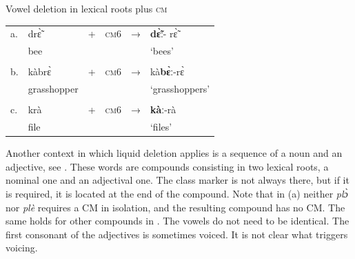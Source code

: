 \documentclass[output=paper]{langscibook}
\begin{document}
    \begin{exe} 
        \ex Vowel deletion in lexical roots plus \textsc{cm} \label{ex:traore:liquidDeletionLexicalRootsCM:27}\\
        \begin{tabularx}{.8\textwidth}{l l l l l l}
            a. & drɛ̃̀        &   +   &   \textsc{cm}6    &   →   & \textbf{dɛ̃̀ː}{}-    rɛ̃̀ \\               
             &  bee           &       &                   &       &  `bees'\\
                            &       &                   & &      &       \\
          b. & kàbrɛ̀             &   +   &  \textsc{cm}6     &   →   & kà\textbf{bɛ̀ː}{}-rɛ̀\\
          & grasshopper       &       &                   &       & `grasshoppers'\\
                                      &       &           &        &       &       \\
            c. & krà             &  +    &   \textsc{cm}6    &   →   &   \textbf{kàː}{}-rà\\
        &     file            &       &                   &       &   `files'\\
        \end{tabularx}
    \end{exe}

Another context in which liquid deletion applies is a sequence of a noun and an adjective, see . These words are compounds consisting in two lexical roots, a nominal one and an adjectival one. The class marker is not always there, but if it is required, it is located at the end of the compound. Note that in (a) neither \textit{plɔ̀} nor \textit{plè} requires a CM in isolation, and the resulting compound has no CM. The same holds for other compounds in . The vowels do not need to be identical. The first consonant of the adjectives is sometimes voiced. It is not clear what triggers voicing.
\end{document}

